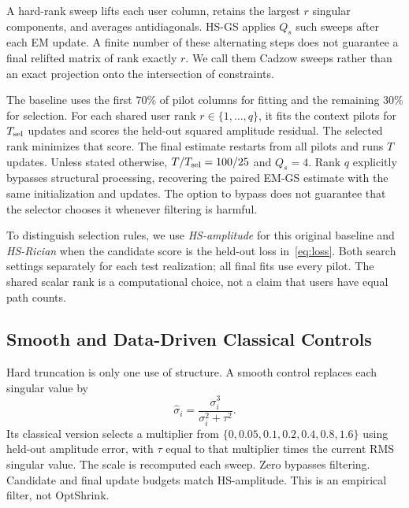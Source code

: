 \documentclass[10pt,journal,letterpaper]{IEEEtran}
\begin{document}
A hard-rank sweep lifts each user column, retains the largest $r$ singular components, and averages antidiagonals. HS-GS applies $Q_s$ such sweeps after each EM update. A finite number of these alternating steps does not guarantee a final relifted matrix of rank exactly $r$. We call them Cadzow sweeps rather than an exact projection onto the intersection of constraints.

The baseline uses the first 70\% of pilot columns for fitting and the remaining 30\% for selection. For each shared user rank $r\in\{1,\ldots,q\}$, it fits the context pilots for $T_{\rm sel}$ updates and scores the held-out squared amplitude residual. The selected rank minimizes that score. The final estimate restarts from all pilots and runs $T$ updates. Unless stated otherwise, $T/T_{\rm sel}=100/25$ and $Q_s=4$. Rank $q$ explicitly bypasses structural processing, recovering the paired EM-GS estimate with the same initialization and updates. The option to bypass does not guarantee that the selector chooses it whenever filtering is harmful.

To distinguish selection rules, we use \emph{HS-amplitude} for this original baseline and \emph{HS-Rician} when the candidate score is the held-out loss in~\eqref{eq:loss}. Both search settings separately for each test realization; all final fits use every pilot. The shared scalar rank is a computational choice, not a claim that users have equal path counts.

\subsection{Smooth and Data-Driven Classical Controls}
Hard truncation is only one use of structure. A smooth control replaces each singular value by
\begin{equation}
 \widehat\sigma_i=\frac{\sigma_i^3}{\sigma_i^2+\tau^2}.
 \label{eq:shrink}
\end{equation}
Its classical version selects a multiplier from $\{0,0.05,0.1,0.2,0.4,0.8,1.6\}$ using held-out amplitude error, with $\tau$ equal to that multiplier times the current RMS singular value. The scale is recomputed each sweep. Zero bypasses filtering. Candidate and final update budgets match HS-amplitude. This is an empirical filter, not OptShrink.
\end{document}

